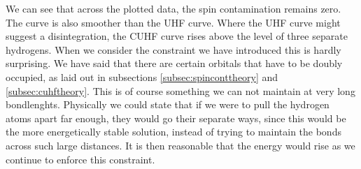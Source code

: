 We can see that across the plotted data, the spin contamination remains zero. The curve is also smoother than the UHF curve. Where
the UHF curve might suggest a disintegration, the CUHF curve rises above the level of three separate hydrogens. When we consider the constraint we have introduced this is hardly
surprising. We have said that there are certain orbitals that have to be doubly occupied, as laid out in subsections \ref{subsec:spinconttheory} and \ref{subsec:cuhftheory}.
This is of course something we can not maintain at very long bondlenghts. Physically we could state that if we were to pull the hydrogen atoms apart far enough, they would go
their separate ways, since this would be the more energetically stable solution, instead of trying to maintain the bonds across such large distances. It is then reasonable that
the energy would rise as we continue to enforce this constraint.

